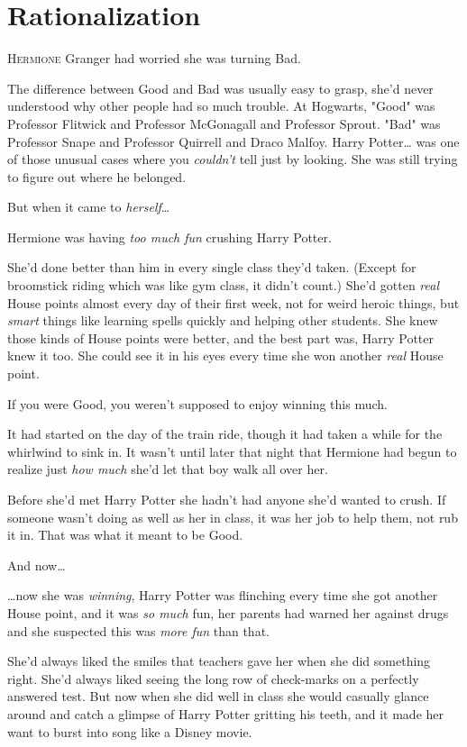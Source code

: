 \chapter{Rationalization}

\lettrine{H}{ermione} Granger had worried she was turning Bad.

The difference between Good and Bad was usually easy to grasp, she'd never 
understood why other people had so much trouble. At Hogwarts, "Good" was 
Professor Flitwick and Professor McGonagall and Professor Sprout. "Bad" was 
Professor Snape and Professor Quirrell and Draco Malfoy. Harry Potter{\ldots} 
was one of those unusual cases where you \emph{couldn't} tell just by looking. 
She was still trying to figure out where he belonged.

But when it came to \emph{herself}{\ldots}

Hermione was having \emph{too much fun} crushing Harry Potter.

She'd done better than him in every single class they'd taken. (Except for 
broomstick riding which was like gym class, it didn't count.) She'd gotten 
\emph{real} House points almost every day of their first week, not for weird 
heroic things, but \emph{smart} things like learning spells quickly and helping 
other students. She knew those kinds of House points were better, and the best 
part was, Harry Potter knew it too. She could see it in his eyes every time she 
won another \emph{real} House point.

If you were Good, you weren't supposed to enjoy winning this much.

It had started on the day of the train ride, though it had taken a while for 
the whirlwind to sink in. It wasn't until later that night that Hermione had 
begun to realize just \emph{how much} she'd let that boy walk all over her.

Before she'd met Harry Potter she hadn't had anyone she'd wanted to crush. If 
someone wasn't doing as well as her in class, it was her job to help them, not 
rub it in. That was what it meant to be Good.

And now{\ldots}

{\ldots}now she was \emph{winning}, Harry Potter was flinching every time she 
got another House point, and it was \emph{so much} fun, her parents had warned 
her against drugs and she suspected this was \emph{more fun} than that.

She'd always liked the smiles that teachers gave her when she did something 
right. She'd always liked seeing the long row of check-marks on a perfectly 
answered test. But now when she did well in class she would casually glance 
around and catch a glimpse of Harry Potter gritting his teeth, and it made her 
want to burst into song like a Disney movie.

